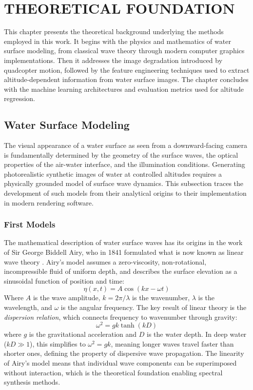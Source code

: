 \section{THEORETICAL FOUNDATION}

This chapter presents the theoretical background underlying the methods employed in this work. It begins with the physics and mathematics of water surface modeling, from classical wave theory through modern computer graphics implementations. Then it addresses the image degradation introduced by quadcopter motion, followed by the feature engineering techniques used to extract altitude-dependent information from water surface images. The chapter concludes with the machine learning architectures and evaluation metrics used for altitude regression.

\subsection{Water Surface Modeling}

The visual appearance of a water surface as seen from a downward-facing camera is fundamentally determined by the geometry of the surface waves, the optical properties of the air-water interface, and the illumination conditions. Generating photorealistic synthetic images of water at controlled altitudes requires a physically grounded model of surface wave dynamics. This subsection traces the development of such models from their analytical origins to their implementation in modern rendering software.

    \subsubsection{First Models}

    The mathematical description of water surface waves has its origins in the work of Sir George Biddell Airy, who in 1841 formulated what is now known as linear wave theory \cite{Airy1841}. Airy's model assumes a zero-viscosity, non-rotational, incompressible fluid of uniform depth, and describes the surface elevation as a sinusoidal function of position and time:
    \begin{equation}
        \eta(x, t) = A \cos(kx - \omega t)
        \label{eq:airy}
    \end{equation}
    Where $A$ is the wave amplitude, $k = 2\pi/\lambda$ is the wavenumber, $\lambda$ is the wavelength, and $\omega$ is the angular frequency. The key result of linear theory is the \emph{dispersion relation}, which connects frequency to wavenumber through gravity:
    \begin{equation}
        \omega^2 = gk \tanh(kD)
        \label{eq:dispersion}
    \end{equation}
    where $g$ is the gravitational acceleration and $D$ is the water depth. In deep water ($kD \gg 1$), this simplifies to $\omega^2 = gk$, meaning longer waves travel faster than shorter ones, defining the property of dispersive wave propagation. The linearity of Airy's model means that individual wave components can be superimposed without interaction, which is the theoretical foundation enabling spectral synthesis methods.

